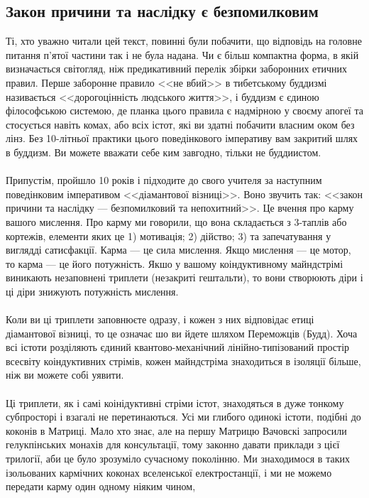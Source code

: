 \newpage
\subsection{Закон причини та наслідку є безпомилковим}

Ті, хто уважно читали цей текст, повинні були побачити, що відповідь на головне питання п'ятої частини так і не була надана.
Чи є більш компактна форма, в якій визначається світогляд, ніж предикативний перелік збірки заборонних етичних правил.
Перше заборонне правило <<не вбий>> в тибетському буддизмі називається <<дорогоцінність людського життя>>, і буддизм
є єдиною філософською системою, де планка цього правила є надмірною у своєму апогеї та стосується навіть комах, або
всіх істот, які ви здатні побачити власним оком без лінз. Без 10-літньої практики цього поведінкового імперативу
вам закритий шлях в буддизм. Ви можете вважати себе ким завгодно, тільки не буддиистом.
\\
\\
Припустім, пройшло 10 років і підходите до свого учителя за наступним поведінковим імперативом <<діамантової візниці>>.
Воно звучить так: <<закон причини та наслідку --- безпомилковий та непохитний>>. Це вчення про карму вашого мислення.
Про карму ми говорили, що вона складається з 3-таплів або кортежів, елементи яких це 1) мотивація; 2) дійство; 3) та запечатування у виглядді сатисфакції.
Карма --- це сила мислення. Якщо мислення --- це мотор, то карма --- це його потужність. Якшо у вашому коіндуктивному майндстрімі
виникають незаповнені триплети (незакриті гештальти), то вони створюють діри і ці діри знижують потужність мислення.
\\
\\
Коли ви ці триплети заповнюєте одразу, і кожен з них відповідає етиці діамантової візниці, то це означає шо
ви йдете шляхом Переможців (Будд). Хоча всі істоти розділяють єдиний квантово-механічний лінійно-типізований простір
всесвіту коіндуктивних стрімів, кожен майндстріма знаходиться в ізоляції більше, ніж ви можете собі уявити.
\\
\\
Ці триплети, як і самі коінідуктивні стріми істот, знаходяться в дуже тонкому субпросторі і взагалі не перетинаються.
Усі ми глибого одинокі істоти, подібні до коконів в Матриці.
Мало хто знає, але на першу Матрицю Вачовскі запросили гелукпінських монахів для консультації, тому
законно давати приклади з цієї трилогії, аби це було зрозуміло сучасному поколінню. Ми знаходимося в таких
ізольованих кармічних коконах вселенської електростанції, і ми не можемо передати карму один одному ніяким чином,
